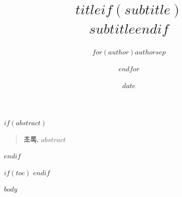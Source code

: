 \documentclass[$if(fontsize)$$fontsize$,$endif$$if(papersize)$$papersize$paper,$endif$openany]{$if(documentclass)$$documentclass$$else$book$endif$}
\title{$title$$if(subtitle)$\\\large $subtitle$$endif$}
\author{$for(author)$$author$$sep$ \and $endfor$}
\date{$date$}
\providecommand{\abstractname}{초록}
\newenvironment{abstract}{\small\begin{quote}\noindent\textbf{\abstractname.}\quad}{\end{quote}\normalsize}
\begin{document}
\maketitle

$if(abstract)$
\begin{abstract}
$abstract$
\end{abstract}
$endif$

$if(toc)$
\tableofcontents
\clearpage
$endif$

$body$
\end{document}
